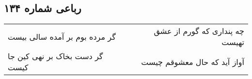 \begin{center}
\section*{رباعی شماره ۱۳۴}
\label{sec:sh134}
\begin{longtable}{l p{0.5cm} r}
گر مرده بوم بر آمده سالی بیست
&&
چه پنداری که گورم از عشق تهیست
\\
گر دست بخاک بر نهی کین جا کیست
&&
آواز آید که حال معشوقم چیست
\\
\end{longtable}
\end{center}
